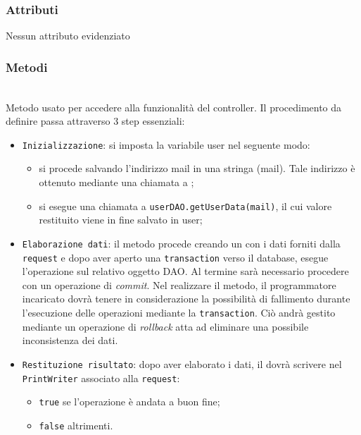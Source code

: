 \subsubsection*{Attributi}

Nessun attributo evidenziato

\subsubsection*{Metodi}
\begin{description}
	
	\item{}\\
	Metodo usato per accedere alla funzionalità del controller. Il procedimento da definire passa attraverso 3 step essenziali:
	\begin{itemize}
		\item \texttt{Inizializzazione}: si imposta la variabile user nel seguente modo:
			\begin{itemize}
				\item si procede salvando l'indirizzo mail in una stringa (mail). Tale indirizzo è ottenuto mediante una chiamata a ;
				\item si esegue una chiamata a \texttt{userDAO.getUserData(mail)}, il cui valore restituito viene in fine salvato in user;
			\end{itemize}
		\item \texttt{Elaborazione dati}: il metodo procede creando un  con i dati forniti dalla \texttt{request} e dopo aver aperto una \texttt{transaction} verso il database, esegue l'operazione  sul relativo oggetto DAO. Al termine sarà necessario procedere con un operazione di \textit{commit}. Nel realizzare il metodo, il programmatore incaricato dovrà tenere in considerazione la possibilità di fallimento durante l'esecuzione delle operazioni mediante la \texttt{transaction}. Ciò andrà gestito mediante un operazione di \textit{rollback} atta ad eliminare una possibile inconsistenza dei dati.
		\item \texttt{Restituzione risultato}: dopo aver elaborato i dati, il  dovrà scrivere nel \texttt{PrintWriter} associato alla \texttt{request}:
			\begin{itemize}
				\item \texttt{true} se l'operazione è andata a buon fine;
				\item \texttt{false} altrimenti.
			\end{itemize}
	\end{itemize}

\end{description}

